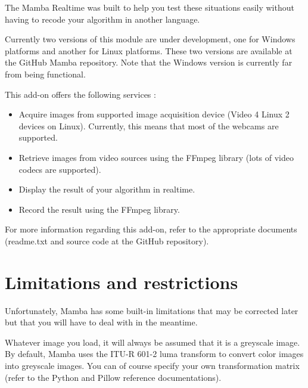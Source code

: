\documentclass[a4paper,10pt,oneside]{article}
\begin{document}
The Mamba Realtime was built to help you test these situations easily without 
having to recode your algorithm in another language.

Currently two versions of this module are under development, one for Windows platforms and 
another for Linux platforms. These two versions are available at the GitHub
Mamba repository. Note that the Windows version is currently far from being
functional.


This add-on offers the following services :

\begin{itemize}
\item Acquire images from supported image acquisition device (Video 4 Linux 2
devices on Linux). Currently, this means that most of the webcams are 
supported.
\item Retrieve images from video sources using the FFmpeg library (lots of video
codecs are supported).
\item Display the result of your algorithm in realtime.
\item Record the result using the FFmpeg library.
\end{itemize}


For more information regarding this add-on, refer to the appropriate documents
(readme.txt and source code at the GitHub repository).

\pagebreak

\section{Limitations and restrictions}
\label{cha:lim_restrict}

Unfortunately, Mamba has some built-in limitations that may be corrected later
but that you will have to deal with in the meantime.

Whatever image you load, it will always be assumed that it is a greyscale image.
By default, Mamba uses the ITU-R 601-2 luma transform to convert color images 
into greyscale images. You can of course specify your own transformation matrix 
(refer to the Python and Pillow reference documentations).
\end{document}
